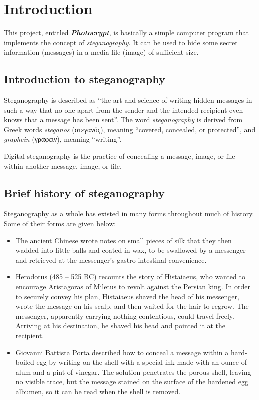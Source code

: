 \section{Introduction}

This project, entitled \emph{\textbf{Photocrypt}}, is basically a simple
computer program that implements the concept of \emph{steganography}. It can
be used to hide some secret information (messages) in a media file (image)
of sufficient size.

\subsection{Introduction to steganography}

Steganography is described as ``the art and science of writing hidden messages
in such a way that no one apart from the sender and the intended recipient
even knows that a message has been sent''. The word \emph{steganography} is
derived from Greek words \emph{steganos} (στεγανός), meaning ``covered,
concealed, or protected'', and \emph{graphein} (γράφειν), meaning ``writing''.

Digital steganography is the practice of concealing a message, image, or file
within another message, image, or file.

\subsection{Brief history of steganography}

Steganography as a whole has existed in many forms throughout much of history.
Some of their forms are given below:

\begin{itemize}
    \item{} The ancient Chinese wrote notes on small pieces of silk that they
        then wadded into little balls and coated in wax, to be swallowed by a
        messenger and retrieved at the messenger's gastro-intestinal
        convenience.
    \item{} Herodotus (485 -- 525 BC) recounts the story of Histaiaeus, who
        wanted to encourage Aristagoras of Miletus to revolt against the
        Persian king. In order to securely convey his plan, Histaiaeus shaved
        the head of his messenger, wrote the message on his scalp, and then
        waited for the hair to regrow. The messenger, apparently carrying
        nothing contentious, could travel freely. Arriving at his destination,
        he shaved his head and pointed it at the recipient.
    \item{} Giovanni Battista Porta described how to conceal a message within
        a hard-boiled egg by writing on the shell with a special ink made with
        an ounce of alum and a pint of vinegar. The solution penetrates the
        porous shell, leaving no visible trace, but the message stained on the
        surface of the hardened egg albumen, so it can be read when the shell
        is removed.
\end{itemize}
